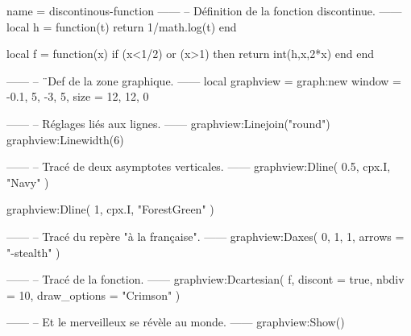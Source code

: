 \documentclass{standalone}
\begin{document}
\begin{luadraw}{name = discontinous-function}
------
-- Définition de la fonction discontinue.
------
local h = function(t)
  return 1/math.log(t)
end

local f = function(x)
  if (x<1/2) or (x>1) then
    return int(h,x,2*x)
  end
end

------
-- ¨Def de la zone graphique.
------
local graphview = graph:new{
  window = {-0.1, 5, -3, 5},
  size   = {12, 12, 0}
}

------
-- Réglages liés aux lignes.
------
graphview:Linejoin("round")
graphview:Linewidth(6)

------
-- Tracé de deux asymptotes verticales.
------
graphview:Dline(
  {0.5, cpx.I},
  "Navy"
)

graphview:Dline(
  {1, cpx.I},
  "ForestGreen"
)

------
-- Tracé du repère "à la française".
------
graphview:Daxes(
  {0, 1, 1},
  {
    arrows = "-stealth"
  })

------
-- Tracé de la fonction.
------
graphview:Dcartesian(
  f,
  {
    discont      = true,
    nbdiv        = 10,
    draw_options = "Crimson"
  })

------
-- Et le merveilleux se révèle au monde.
------
graphview:Show()
\end{luadraw}
\end{document}
